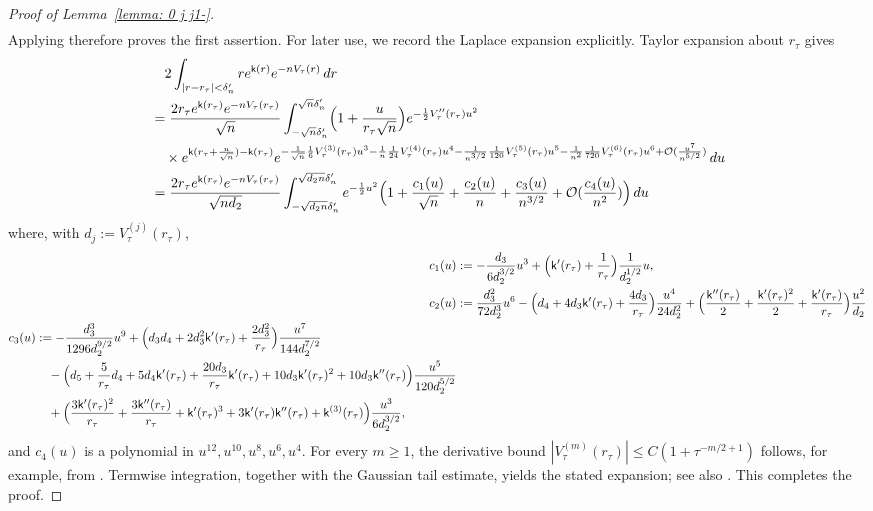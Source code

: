\documentclass[a4paper]{article}
\numberwithin{equation}{section}
\begin{document}
\begin{proof}[Proof of Lemma~\ref{lemma: 0 j j1-}]
\begin{align*}
\end{align*}
Applying \cite[Lemma~4.3]{ACC2023c} therefore proves the first assertion. For later use, we record the Laplace expansion explicitly. Taylor expansion about $r_\tau$ gives
\begin{align*}
&\quad2\int_{|r-r_{\tau}|<\delta_n'}re^{\mathsf{k}(r)}e^{-nV_{\tau}(r)}\,dr
\\
&=    
\frac{2r_{\tau}e^{\mathsf{k}(r_{\tau})}e^{-nV_{\tau}(r_{\tau})}}{\sqrt{n}}\int_{-\sqrt{n}\delta_n'}^{\sqrt{n}\delta_n'}\Bigl(1+\frac{u}{r_{\tau}\sqrt{n}}\Bigr)
e^{-\frac{1}{2}V_{\tau}''(r_{\tau})u^2}
\\
&\quad\times
e^{\mathsf{k}(r_{\tau}+\frac{u}{\sqrt{n}})-\mathsf{k}(r_{\tau})}
e^{-\frac{1}{\sqrt{n}}\frac{1}{6}V_{\tau}^{(3)}(r_{\tau})u^3-\frac{1}{n}\frac{1}{24}V_{\tau}^{(4)}(r_{\tau})u^4-\frac{1}{n^{3/2}}\frac{1}{120}V_{\tau}^{(5)}(r_{\tau})u^5-\frac{1}{n^2}\frac{1}{720}V_{\tau}^{(6)}(r_{\tau})u^6+\mathcal{O}(\frac{u^7}{n^{5/2}})}\,du
\\
&=
\frac{2r_{\tau}e^{\mathsf{k}(r_{\tau})}e^{-nV_{\tau}(r_{\tau})}}{\sqrt{nd_2}}\int_{-\sqrt{d_2n}\delta_n'}^{\sqrt{d_2n}\delta_n'}
e^{-\frac{1}{2}u^2}
\Bigl( 
1+\frac{c_1(u)}{\sqrt{n}}+\frac{c_2(u)}{n}+\frac{c_3(u)}{n^{3/2}}+\mathcal{O}(\frac{c_4(u)}{n^2})
\Bigr)\,du
\end{align*}
where, with $d_j:=V_{\tau}^{(j)}(r_\tau)$,
\begin{align}
\label{def of c_1}
c_1(u)&:=-\frac{d_3}{6d_2^{3/2}}u^3+\Bigl(\mathsf{k}'(r_{\tau})+\frac{1}{r_{\tau}}\Bigr)\frac{1}{d_2^{1/2}}u, 
\\
\label{def of c_2}
c_2(u)&:=\frac{d_3^2}{72d_2^3}u^6-\Bigl(d_4+4d_3\mathsf{k}'(r_{\tau})+\frac{4d_3}{r_{\tau}}\Bigr)\frac{u^4}{24d_2^2}+\Bigl(\frac{\mathsf{k}''(r_{\tau})}{2}+\frac{\mathsf{k}'(r_{\tau})^2}{2}+\frac{\mathsf{k}'(r_{\tau})}{r_{\tau}}\Bigr)\frac{u^2}{d_2}
\\
\begin{split}
\label{def of c_3}
c_3(u)&:=-\frac{d_3^3}{1296d_2^{9/2}}u^9+\Bigl(d_3d_4+2d_3^2\mathsf{k}'(r_{\tau})+\frac{2d_3^2}{r_{\tau}} \Bigr)\frac{u^7}{144d_2^{7/2}}
\\
&\quad
-\Bigl(
d_5+\frac{5}{r_{\tau}}d_4+5d_4\mathsf{k}'(r_{\tau})+\frac{20d_3}{r_{\tau}}\mathsf{k}'(r_{\tau})+10d_3\mathsf{k}'(r_{\tau})^2+10d_3\mathsf{k}''(r_{\tau})
\Bigr)
\frac{u^5}{120d_2^{5/2}}
\\
&\quad
+
\Bigl(\frac{3\mathsf{k}'(r_{\tau})^2}{r_{\tau}}
+\frac{3\mathsf{k}''(r_{\tau})}{r_{\tau}}+\mathsf{k}'(r_{\tau})^3+3\mathsf{k}'(r_{\tau})\mathsf{k}''(r_{\tau})+\mathsf{k}^{(3)}(r_{\tau})\Bigr)\frac{u^3}{6d_2^{3/2}},
\end{split}
\end{align}
and $c_4(u)$ is a polynomial in $u^{12},u^{10},u^8,u^6,u^4$. For every $m\geq1$, the derivative bound $|V_\tau^{(m)}(r_\tau)|\leq C(1+\tau^{-m/2+1})$ follows, for example, from \cite[proof of Lemma~3.2]{BKS2023}. Termwise integration, together with the Gaussian tail estimate, yields the stated expansion; see also \cite[Lemmas~4.1 and 4.3]{ACC2023c}.
This completes the proof. 
\end{proof}
\end{document}
